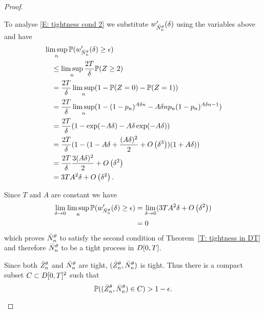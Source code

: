 \begin{proof}
\begin{proofpart}
To analyse \eqref{E: tightness cond 2} we substitute $w'_{\bar{N}_n^{\theta}}(\delta)$ using the variables above and have
\begin{equation}
\begin{aligned}
&\limsup_n \mathbb{P}(w'_{\bar{N}_n^{\theta}}(\delta) \geq \epsilon ) \\
&\quad\leq \limsup_n \frac{2T}{\delta} \mathbb{P}( Z \geq 2 ) \\
&\quad= \frac{2T}{\delta} \limsup_n (1 - \mathbb{P}( Z = 0 ) - \mathbb{P}( Z = 1 )) \\
&\quad= \frac{2T}{\delta} \limsup_n (1 - (1- p_n)^{A\delta n} - A\delta n p_n (1 - p_n)^{A\delta n - 1}) \\
&\quad= \frac{2T}{\delta} (1 - \exp(-A\delta) - A\delta\exp(-A\delta) ) \\
&\quad= \frac{2T}{\delta}(  1 - (1- A\delta + \frac{(A\delta)^2}{2} + O\left(\delta^3\right))(1 + A\delta ) ) \\
&\quad= \frac{2T}{\delta} \frac{3(A\delta)^2}{2} + O\left(\delta^2\right) \\
&\quad= 3TA^2\delta + O\left(\delta^2\right).
\end{aligned}
\end{equation}

Since $T$ and $A$ are constant we have
\begin{equation}
	\begin{aligned}
	\lim_{\delta \rightarrow 0} \limsup_n \mathbb{P}(w'_{\bar{N}_n^{\theta}}(\delta) \geq \epsilon ) 
	&= \lim_{\delta \rightarrow 0} ( 3TA^2\delta + O\left(\delta^2\right) )\\
	&= 0
	\end{aligned}
\end{equation}
which proves $\bar{N}_n^{\theta}$ to satisfy the second condition of Theorem~\ref{T: tightness in DT}
and therefore $\bar{N}_n^{\theta}$ to be a tight process in $D[0, T]$.

Since both $\bar{Z}^{\theta}_n$ and $\bar{N}_n^{\theta}$ are tight, $(\bar{Z}^{\theta}_n, \bar{N}_n^{\theta})$ is tight.
Thus there is a compact subset $C \subset D[0, T]^2$ such that
\begin{equation}
	\mathbb{P}( (\bar{Z}^{\theta}_n, \bar{N}_n^{\theta}) \in C) > 1 - \epsilon.
\end{equation}
\end{proofpart}




\end{proof}
